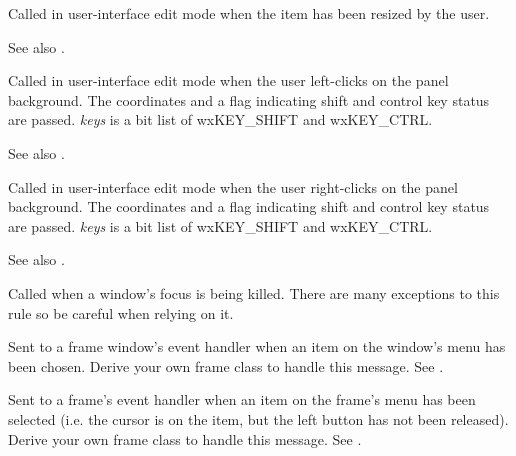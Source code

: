 Called in user-interface edit mode when the item has been resized by the user.

See also .



Called in user-interface edit mode when the user left-clicks on the
panel background. The coordinates and a flag indicating shift and control
key status are passed. {\it keys} is a bit list of wxKEY\_SHIFT and wxKEY\_CTRL.

See also .



Called in user-interface edit mode when the user right-clicks on the
panel background. The coordinates and a flag indicating shift and control
key status are passed. {\it keys} is a bit list of wxKEY\_SHIFT and wxKEY\_CTRL.

See also .



Called when a window's focus is being killed. There are many exceptions to this rule
so be careful when relying on it.

\label{wxevthandleronmenucommand}


Sent to a frame window's event handler when an item on the window's menu has been chosen.
Derive your own frame class to handle this message. See .

\label{wxevthandleronmenuselect}


Sent to a frame's event handler when an item on the frame's menu has been selected
(i.e. the cursor is on the item, but the left button has not been
released). Derive your own frame class to handle this message.
See .

